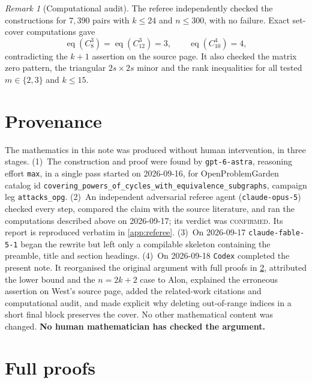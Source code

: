 \documentclass[11pt,a4paper]{article}
\theoremstyle{plain}
\theoremstyle{definition}
\theoremstyle{remark}
\newtheorem{remark}[theorem]{Remark}
\newcommand{\eqc}{\operatorname{eq}}
\begin{document}
\begin{remark}[Computational audit]
The referee independently checked the constructions for $7{,}390$ pairs with
$k\le24$ and $n\le300$, with no failure.  Exact set-cover computations gave
\[
 \eqc(C_8^3)=\eqc(C_{12}^3)=3,
 \qquad \eqc(C_{10}^4)=4,
\]
contradicting the $k+1$ assertion on the source page.  It also checked the matrix zero
pattern, the triangular $2s\times2s$ minor and the rank inequalities for all tested
$m\in\{2,3\}$ and $k\le15$.
\end{remark}

\section{Provenance}\label{sec:provenance}

The mathematics in this note was produced without human intervention, in three stages.
(1)~The construction and proof were found by \texttt{gpt-6-astra}, reasoning effort
\texttt{max}, in a single pass started on 2026-09-16, for OpenProblemGarden catalog id
\texttt{covering\_powers\_of\_cycles\_with\_equivalence\_subgraphs}, campaign leg
\texttt{attacks\_opg}.
(2)~An independent adversarial referee agent (\texttt{claude-opus-5}) checked every
step, compared the claim with the source literature, and ran the computations described
above on 2026-09-17; its verdict was \textsc{confirmed}.  Its report is reproduced
verbatim in \cref{app:referee}.
(3)~On 2026-09-17 \texttt{claude-fable-5-1} began the rewrite but left only a
compilable skeleton containing the preamble, title and section headings.
(4)~On 2026-09-18 \texttt{Codex} completed the present note.  It reorganised the
original argument with full proofs in \cref{app:proofs}, attributed the lower bound and
the $n=2k+2$ case to Alon, explained the erroneous assertion on West's source page,
added the related-work citations and computational audit, and made explicit why deleting
out-of-range indices in a short final block preserves the cover.  No other mathematical
content was changed.  \textbf{No human mathematician has checked the argument.}

\appendix
\section{Full proofs}\label{app:proofs}
\end{document}

